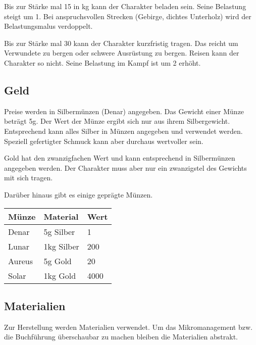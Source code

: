 \documentclass{article}
\begin{document}
Bis zur Stärke mal 15 in kg kann der Charakter beladen sein. Seine Belastung steigt um 1. Bei anspruchsvollen
Strecken (Gebirge, dichtes Unterholz) wird der Belastungsmalus verdoppelt.

Bis zur Stärke mal 30 kann der Charakter kurzfristig tragen. Das reicht um Verwundete zu bergen oder schwere
Ausrüstung zu bergen. Reisen kann der Charakter so nicht. Seine Belastung im Kampf ist um 2 erhöht.

\begin{center}
\subsection{Geld}
\end{center}

Preise werden in Silbermünzen (Denar) angegeben. Das Gewicht einer Münze beträgt 5g. Der Wert der Münze ergibt sich
nur aus ihrem Silbergewicht. Entsprechend kann alles Silber in Münzen angegeben und verwendet werden. Speziell
gefertigter Schmuck kann aber durchaus wertvoller sein.

Gold hat den zwanzigfachen Wert und kann entsprechend in Silbermünzen angegeben werden. Der Charakter muss aber nur
ein zwanzigstel des Gewichts mit sich tragen.

Darüber hinaus gibt es einige geprägte Münzen.


\begin{small}
\begin{tabular}{|m{2cm}|m{2cm}|m{2cm}|}
\hline
\textbf{Münze}&\textbf{Material}&\textbf{Wert}\\
\hline
\hline
Denar&5g Silber&1\\
\hline
Lunar&1kg Silber&200\\
\hline
Aureus&5g Gold&20\\
\hline
Solar&1kg Gold&4000\\
\hline
\end{tabular}
\end{small}

\begin{center}
\subsection{Materialien}
\end{center}

Zur Herstellung werden Materialien verwendet. Um das Mikromanagement bzw. die Buchführung überschaubar zu machen
bleiben die Materialien abstrakt.
\end{document}
